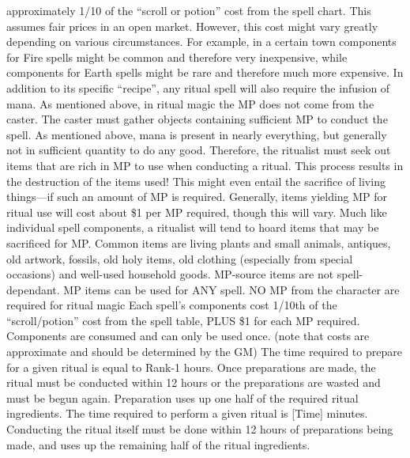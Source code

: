 \documentclass[twoside]{book}
\begin{document}
               approximately 1/10 of the “scroll or potion”
               cost from the spell chart. This assumes fair prices in an
               open market. However, this cost might vary greatly
               depending on various circumstances. For example, in a
               certain town components for Fire spells might be common
               and therefore very inexpensive, while components for Earth
               spells might be rare and therefore much more expensive.
                 In addition to its specific “recipe”,
               any ritual spell will also require the infusion of mana.
               As mentioned above, in ritual magic the MP does not come
               from the caster. The caster must gather objects containing
               sufficient MP to conduct the spell. As mentioned above,
               mana is present in nearly everything, but generally not in
               sufficient quantity to do any good. Therefore, the
               ritualist must seek out items that are rich in MP to use
               when conducting a ritual. This process results in the
               destruction of the items used! This might even entail the
               sacrifice of living things—if such an amount of MP
               is required. Generally, items yielding MP for ritual use
               will cost about \$1 per MP required, though this will vary.
               Much like individual spell components, a ritualist will
               tend to hoard items that may be sacrificed for MP. Common
               items are living plants and small animals, antiques, old
               artwork, fossils, old holy items, old clothing (especially
               from special occasions) and well-used household goods.
               MP-source items are not spell-dependant. MP items can be
               used for ANY spell.   
                  NO MP from the character are required for ritual
                 magic 
                  Each spell’s components cost 1/10th of the
                 “scroll/potion” cost from the spell table,
                 PLUS \$1 for each MP required. Components are consumed
                 and can only be used once. (note that costs are
                 approximate and should be determined by the GM) 
                  The time required to prepare for a given ritual
                 is equal to Rank-1 hours. Once preparations are made,
                 the ritual must be conducted within 12 hours or the
                 preparations are wasted and must be begun again.
                 Preparation uses up one half of the required ritual
                 ingredients. 
                  The time required to perform a given ritual is
                 [Time] minutes. Conducting the ritual itself must be
                 done within 12 hours of preparations being made, and
                 uses up the remaining half of the ritual ingredients.
                 
\end{document}
